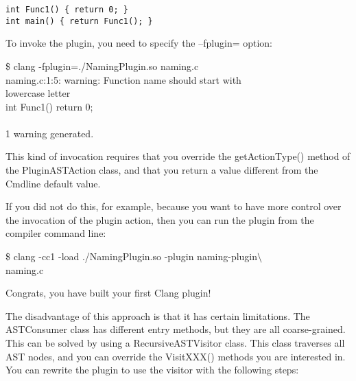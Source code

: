 \begin{lstlisting}[caption={}]
int Func1() { return 0; }
int main() { return Func1(); }
\end{lstlisting}

To invoke the plugin, you need to specify the –fplugin= option:\par

\begin{tcolorbox}[colback=white,colframe=black]
\$ clang -fplugin=./NamingPlugin.so naming.c \\
naming.c:1:5: warning: Function name should start with \\
lowercase letter \\
int Func1() { return 0; } \\
\hspace*{0.7cm}\^ \\
1 warning generated.
\end{tcolorbox}

This kind of invocation requires that you override the getActionType() method of the PluginASTAction class, and that you return a value different from the Cmdline default value.\par

If you did not do this, for example, because you want to have more control over the invocation of the plugin action, then you can run the plugin from the compiler command line:\par

\begin{tcolorbox}[colback=white,colframe=black]
\$ clang -cc1 -load ./NamingPlugin.so -plugin naming-plugin$\setminus$ \\
\hspace*{0.5cm}naming.c
\end{tcolorbox}

Congrats, you have built your first Clang plugin!\par

The disadvantage of this approach is that it has certain limitations. The ASTConsumer class has different entry methods, but they are all coarse-grained. This can be solved by using a RecursiveASTVisitor class. This class traverses all AST nodes, and you can override the VisitXXX() methods you are interested in. You can rewrite the plugin to use the visitor with the following steps:\par

